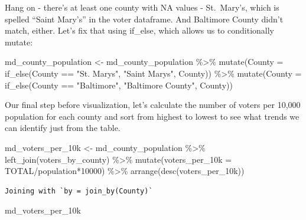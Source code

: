 \documentclass[
  letterpaper,
  DIV=11,
  numbers=noendperiod]{scrreprt}
\newenvironment{Shaded}{\begin{snugshade}}{\end{snugshade}}
\newcommand{\AttributeTok}[1]{\textcolor[rgb]{0.40,0.45,0.13}{#1}}
\newcommand{\DecValTok}[1]{\textcolor[rgb]{0.68,0.00,0.00}{#1}}
\newcommand{\FunctionTok}[1]{\textcolor[rgb]{0.28,0.35,0.67}{#1}}
\newcommand{\NormalTok}[1]{\textcolor[rgb]{0.00,0.23,0.31}{#1}}
\newcommand{\OtherTok}[1]{\textcolor[rgb]{0.00,0.23,0.31}{#1}}
\newcommand{\SpecialCharTok}[1]{\textcolor[rgb]{0.37,0.37,0.37}{#1}}
\newcommand{\StringTok}[1]{\textcolor[rgb]{0.13,0.47,0.30}{#1}}
\begin{document}
Hang on - there's at least one county with NA values - St.~Mary's, which
is spelled ``Saint Mary's'' in the voter dataframe. And Baltimore County
didn't match, either. Let's fix that using if\_else, which allows us to
conditionally mutate:

\begin{Shaded}
\begin{Highlighting}[]
\NormalTok{md\_county\_population }\OtherTok{\textless{}{-}}\NormalTok{ md\_county\_population }\SpecialCharTok{\%\textgreater{}\%}
  \FunctionTok{mutate}\NormalTok{(}\AttributeTok{County =} \FunctionTok{if\_else}\NormalTok{(County }\SpecialCharTok{==} \StringTok{"St. Mary\textquotesingle{}s"}\NormalTok{, }\StringTok{"Saint Mary\textquotesingle{}s"}\NormalTok{, County)) }\SpecialCharTok{\%\textgreater{}\%} 
  \FunctionTok{mutate}\NormalTok{(}\AttributeTok{County =} \FunctionTok{if\_else}\NormalTok{(County }\SpecialCharTok{==} \StringTok{"Baltimore"}\NormalTok{, }\StringTok{"Baltimore County"}\NormalTok{, County))}
\end{Highlighting}
\end{Shaded}

Our final step before visualization, let's calculate the number of
voters per 10,000 population for each county and sort from highest to
lowest to see what trends we can identify just from the table.

\begin{Shaded}
\begin{Highlighting}[]
\NormalTok{md\_voters\_per\_10k }\OtherTok{\textless{}{-}}\NormalTok{ md\_county\_population }\SpecialCharTok{\%\textgreater{}\%}
  \FunctionTok{left\_join}\NormalTok{(voters\_by\_county) }\SpecialCharTok{\%\textgreater{}\%}
  \FunctionTok{mutate}\NormalTok{(}\AttributeTok{voters\_per\_10k =}\NormalTok{ TOTAL}\SpecialCharTok{/}\NormalTok{population}\SpecialCharTok{*}\DecValTok{10000}\NormalTok{) }\SpecialCharTok{\%\textgreater{}\%}
  \FunctionTok{arrange}\NormalTok{(}\FunctionTok{desc}\NormalTok{(voters\_per\_10k))}
\end{Highlighting}
\end{Shaded}

\begin{verbatim}
Joining with `by = join_by(County)`
\end{verbatim}

\begin{Shaded}
\begin{Highlighting}[]
\NormalTok{md\_voters\_per\_10k}
\end{Highlighting}
\end{Shaded}
\end{document}
